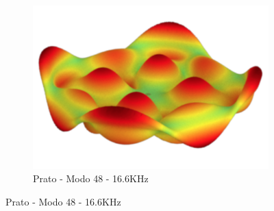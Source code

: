 \begin{figure}[ht]
\begin{subfigure}{0.32\textwidth}
	\includegraphics[height=0.15\textheight]{mathematicalbackground/modes/plate_48.png}
	\caption{Prato - Modo 48 - 16.6KHz}\label{fig:plates_48}
\end{subfigure}%


\end{figure}
